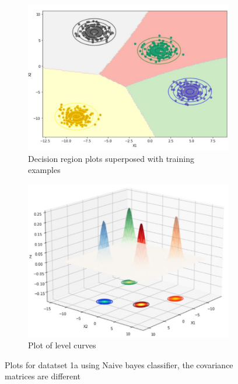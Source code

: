 \documentclass[11pt]{article}
\begin{document}
\begin{figure}[h]
\centering
	\begin{subfigure}[b]{0.45\textwidth}
	\centering
	\includegraphics[scale=0.3]{dataset1a_differentC_nb_2D.jpg}
	\caption{Decision region plots superposed with training examples}
	\label{fig:fig2.2.3.1}
	\end{subfigure}
	\hfill
	\begin{subfigure}[b]{0.45\textwidth}
	\centering
	\includegraphics[scale=0.3]{dataset1a_differentC_nb_3D.jpg}
	\caption{Plot of level curves}
	\label{fig:fig2.2.3.2}
	\end{subfigure}
\caption{Plots for datatset 1a using Naive bayes classifier, the covariance matrices are different }
\label{fig:fig1.2.1}
\end{figure}
\end{document}
